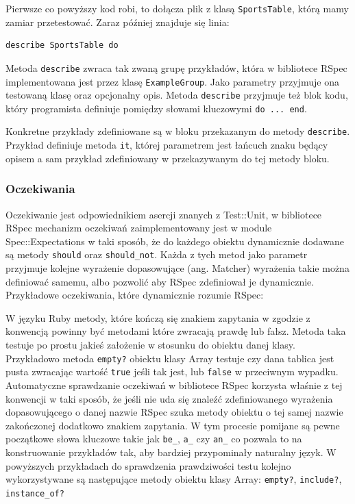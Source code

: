     
    
    Pierwsze co powyższy kod robi, to dołącza plik z klasą \verb+SportsTable+, którą mamy zamiar przetestować. Zaraz później znajduje się linia:
    
\begin{lstlisting}
describe SportsTable do
\end{lstlisting}
    
    Metoda \verb+describe+ zwraca tak zwaną grupę przykładów, która w bibliotece RSpec implementowana jest przez klasę \verb+ExampleGroup+. Jako parametry przyjmuje ona testowaną klasę oraz opcjonalny opis. Metoda \verb+describe+ przyjmuje też blok kodu, który programista definiuje pomiędzy słowami kluczowymi \verb+do ... end+.
    
    Konkretne przykłady zdefiniowane są w bloku przekazanym do metody \verb+describe+. Przykład definiuje metoda \verb+it+, której parametrem jest łańcuch znaku będący opisem a sam przykład zdefiniowany w przekazywanym do tej metody bloku.
    
    \subsubsection{Oczekiwania}
    Oczekiwanie jest odpowiednikiem asercji znanych z Test::Unit, w bibliotece RSpec mechanizm oczekiwań zaimplementowany jest w module Spec::Expectations w taki sposób, że do każdego obiektu dynamicznie dodawane są metody \verb+should+ oraz \verb+should_not+. Każda z tych metod jako parametr przyjmuje kolejne wyrażenie dopasowujące (ang. Matcher) wyrażenia takie można definiować samemu, albo pozwolić aby RSpec zdefiniował je dynamicznie. Przykładowe oczekiwania, które dynamicznie rozumie RSpec:
    
    
    
    W języku Ruby metody, które kończą się znakiem zapytania w zgodzie z konwencją powinny być metodami które zwracają prawdę lub fałsz. Metoda taka testuje po prostu jakieś założenie w stosunku do obiektu danej klasy. Przykładowo metoda \verb+empty?+ obiektu klasy Array testuje czy dana tablica jest pusta zwracając wartość \verb+true+ jeśli tak jest, lub \verb+false+ w przeciwnym wypadku. Automatyczne sprawdzanie oczekiwań w bibliotece RSpec korzysta właśnie z tej konwencji w taki sposób, że jeśli nie uda się znaleźć zdefiniowanego wyrażenia dopasowującego o danej nazwie RSpec szuka metody obiektu o tej samej nazwie zakończonej dodatkowo znakiem zapytania. W tym procesie pomijane są pewne początkowe słowa kluczowe takie jak \verb+be_+, \verb+a_+ czy \verb+an_+ co pozwala to na konstruowanie przykładów tak, aby bardziej przypominały naturalny język. W powyższych przykładach do sprawdzenia prawdziwości testu kolejno wykorzystywane są następujące metody obiektu klasy Array: \verb+empty?+, \verb+include?+, \verb+instance_of?+
    
